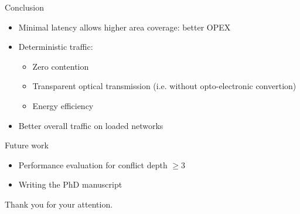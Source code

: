 \documentclass[10 pt]{beamer}
\begin{document}
  \begin{frame}{Conclusion}
  \begin{itemize}
   \item Minimal latency allows higher area coverage: better OPEX
   \item Deterministic traffic:
     \begin{itemize}
   \item Zero contention
   \item Transparent optical transmission (i.e. without opto-electronic convertion)
   \item Energy efficiency 
  \end{itemize}
  \item Better overall traffic on loaded networks
  \end{itemize}

  \vspace{1cm}
  \pause
  Future work
\begin{itemize}
 \item Performance evaluation for conflict depth $\geq 3$
 \item Writing the PhD manuscript
\end{itemize}


\pause
\hspace{2cm}\huge{Thank you for your attention.}
  

\end{frame}
\end{document}
